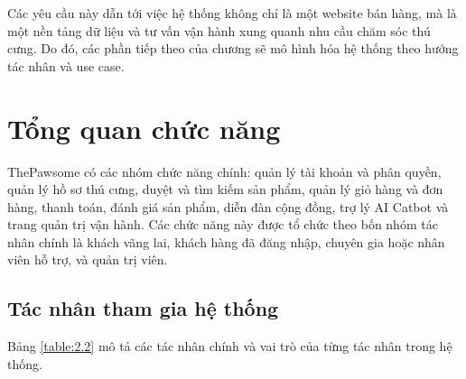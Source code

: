 \documentclass[../DoAn.tex]{subfiles}
\begin{document}
Các yêu cầu này dẫn tới việc hệ thống không chỉ là một website bán hàng, mà là một nền tảng dữ liệu và tư vấn vận hành xung quanh nhu cầu chăm sóc thú cưng. Do đó, các phần tiếp theo của chương sẽ mô hình hóa hệ thống theo hướng tác nhân và use case.

\section{Tổng quan chức năng}
\label{section:2.2}

ThePawsome có các nhóm chức năng chính: quản lý tài khoản và phân quyền, quản lý hồ sơ thú cưng, duyệt và tìm kiếm sản phẩm, quản lý giỏ hàng và đơn hàng, thanh toán, đánh giá sản phẩm, diễn đàn cộng đồng, trợ lý AI Catbot và trang quản trị vận hành. Các chức năng này được tổ chức theo bốn nhóm tác nhân chính là khách vãng lai, khách hàng đã đăng nhập, chuyên gia hoặc nhân viên hỗ trợ, và quản trị viên.

\subsection{Tác nhân tham gia hệ thống}
\label{subsection:2.2.1}

Bảng \ref{table:2.2} mô tả các tác nhân chính và vai trò của từng tác nhân trong hệ thống.
\end{document}

